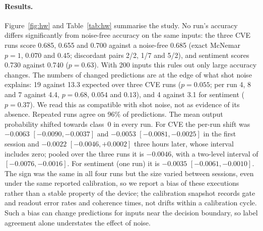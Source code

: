 \documentclass[11pt]{article}
\begin{document}
\paragraph{Results.} Figure~\ref{fig:hw} and Table~\ref{tab:hw} summarise the study. No run's accuracy differs significantly from noise-free accuracy on the same inputs: the three CVE runs score 0.685, 0.655 and 0.700 against a noise-free 0.685 (exact McNemar $p = 1$, $0.070$ and $0.45$; discordant pairs 2/2, 1/7 and 5/2), and sentiment scores 0.730 against 0.740 ($p = 0.63$). With 200 inputs this rules out only large accuracy changes. The numbers of changed predictions are at the edge of what shot noise explains: 19 against 13.3 expected over three CVE runs ($p = 0.055$; per run 4, 8 and 7 against 4.4, $p = 0.68$, $0.054$ and $0.13$), and 4 against 3.1 for sentiment ($p = 0.37$). We read this as compatible with shot noise, not as evidence of its absence. Repeated runs agree on 96\% of predictions. The mean output probability shifted towards class~0 in every run. For CVE the per-run shift was $-0.0063$ $[-0.0090, -0.0037]$ and $-0.0053$ $[-0.0081, -0.0025]$ in the first session and $-0.0022$ $[-0.0046, +0.0002]$ three hours later, whose interval includes zero; pooled over the three runs it is $-0.0046$, with a two-level interval of $[-0.0076, -0.0016]$. For sentiment (one run) it is $-0.0035$ $[-0.0061, -0.0010]$. The sign was the same in all four runs but the size varied between sessions, even under the same reported calibration, so we report a bias of these executions rather than a stable property of the device; the calibration snapshot records gate and readout error rates and coherence times, not drifts within a calibration cycle. Such a bias can change predictions for inputs near the decision boundary, so label agreement alone understates the effect of noise.
\end{document}
